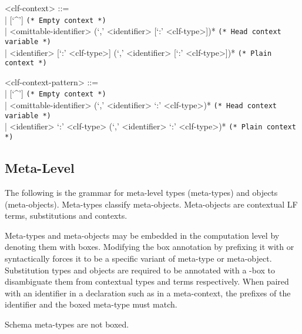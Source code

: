 \documentclass[11pt]{article}
\newcommand{\LF}{\textsc{LF}\xspace}
\begin{document}
\begin{grammar}
<clf-context> ::= \hfill\\
| [`^'] \hfill \texttt{(* Empty context *)}\\
| <omittable-identifier> (`,' <identifier> [`:' <clf-type>])* \hfill \texttt{(* Head context variable *)}\\
| <identifier> [`:' <clf-type>] (`,' <identifier> [`:' <clf-type>])* \hfill \texttt{(* Plain context *)}

<clf-context-pattern> ::= \hfill\\
| [`^'] \hfill \texttt{(* Empty context *)}\\
| <omittable-identifier> (`,' <identifier> `:' <clf-type>)* \hfill \texttt{(* Head context variable *)}\\
| <identifier> `:' <clf-type> (`,' <identifier> `:' <clf-type>)* \hfill \texttt{(* Plain context *)}
\end{grammar}

\subsection{Meta-Level}\label{section:syntax-meta-level}

The following is the grammar for meta-level types (meta-types) and objects (meta-objects).
Meta-types classify meta-objects.
Meta-objects are contextual \LF terms, substitutions and contexts.

Meta-types and meta-objects may be embedded in the computation level by denoting them with boxes.
Modifying the box annotation by prefixing it with \syntax{\#} or \syntax{\$} syntactically forces it to be a specific variant of meta-type or meta-object.
Substitution types and objects are required to be annotated with a \syntax{\$}-box to disambiguate them from contextual types and terms respectively.
When paired with an identifier in a declaration such as in a meta-context, the prefixes of the identifier and the boxed meta-type must match.

Schema meta-types are not boxed.
\end{document}
